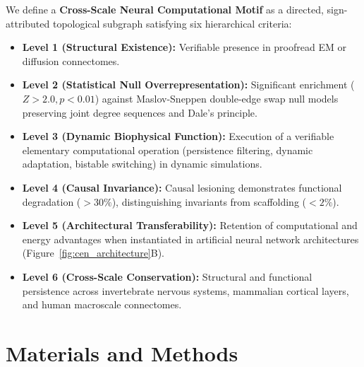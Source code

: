 \documentclass[10pt,twocolumn,letterpaper]{article}
\begin{document}
We define a \textbf{Cross-Scale Neural Computational Motif} as a directed, sign-attributed topological subgraph satisfying six hierarchical criteria:
\begin{itemize}[leftmargin=*]
    \item \textbf{Level 1 (Structural Existence):} Verifiable presence in proofread EM or diffusion connectomes.
    \item \textbf{Level 2 (Statistical Null Overrepresentation):} Significant enrichment ($Z > 2.0, p < 0.01$) against Maslov-Sneppen double-edge swap null models preserving joint degree sequences and Dale's principle.
    \item \textbf{Level 3 (Dynamic Biophysical Function):} Execution of a verifiable elementary computational operation (persistence filtering, dynamic adaptation, bistable switching) in dynamic simulations.
    \item \textbf{Level 4 (Causal Invariance):} Causal lesioning demonstrates functional degradation ($>30\%$), distinguishing invariants from scaffolding ($<2\%$).
    \item \textbf{Level 5 (Architectural Transferability):} Retention of computational and energy advantages when instantiated in artificial neural network architectures (Figure~\ref{fig:cen_architecture}B).
    \item \textbf{Level 6 (Cross-Scale Conservation):} Structural and functional persistence across invertebrate nervous systems, mammalian cortical layers, and human macroscale connectomes.
\end{itemize}

\section{Materials and Methods}
\end{document}
